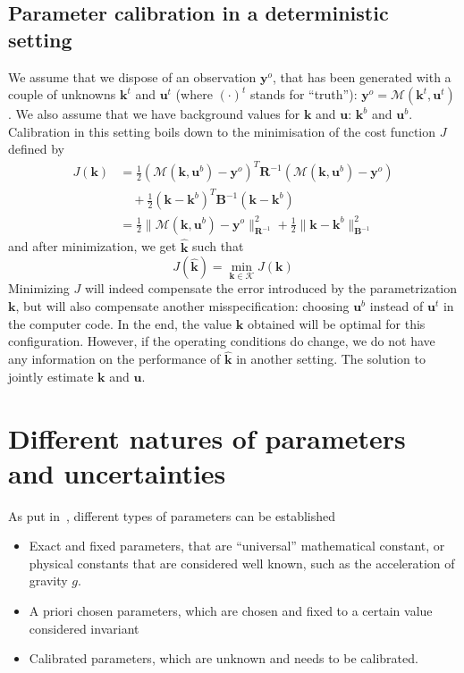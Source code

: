 \documentclass[npg]{copernicus}
\newcommand{\yobs}{\mathbf{y}^o}
\begin{document}
\subsection{Parameter calibration in a deterministic setting}
We assume that we dispose of an observation $\yobs$, that has been generated with a couple of unknowns $\mathbf{k}^t$ and $\mathbf{u}^t$ (where $(\cdot)^t$ stands for ``truth''): $\yobs=  \mathcal{M}(\mathbf{k}^t, \mathbf{u}^t)$. We also assume that we have background values for $\mathbf{k}$ and $\mathbf{u}$: $\mathbf{k}^b$ and $\mathbf{u}^b$. Calibration in this setting boils down to the minimisation of the cost function $J$ defined by
\begin{align}
  \label{eq:def_cost_fun}
  J(\mathbf{k}) &= \frac12(\mathcal{M}(\mathbf{k},\mathbf{u}^b) - \yobs)^T \mathbf{R}^{-1}  (\mathcal{M}(\mathbf{k},\mathbf{u}^b)-\yobs) \nonumber\\
                & \quad +\frac12 (\mathbf{k}-\mathbf{k}^b)^T \mathbf{B}^{-1} (\mathbf{k}-\mathbf{k}^b) \nonumber \\
                & = \frac12\|\mathcal{M}(\mathbf{k},\mathbf{u}^b) - \yobs \|_{\mathbf{R}^{-1}}^2 + \frac12\|\mathbf{k}-\mathbf{k}^b\|_{\mathbf{B}^{-1}}^2 
\end{align}
and after minimization, we get $\hat{\mathbf{k}}$ such that
\begin{equation}
  \label{eq:khat_def}
  J(\hat{\mathbf{k}}) = \min_{\mathbf{k} \in \mathcal{K}} J(\mathbf{k})
\end{equation}
Minimizing $J$ will indeed compensate the error introduced by the parametrization $\mathbf{k}$, but will also compensate another misspecification: choosing $\mathbf{u}^b$ instead of $\mathbf{u}^t$ in the computer code.
In the end, the value $\hat{\mathbf{k}}$ obtained will be optimal for this configuration. However, if the operating conditions do change, we do not have any information on the performance of $\hat{\mathbf{k}}$ in another setting. The solution to jointly estimate $\mathbf{k}$ and $\mathbf{u}$.

\section{Different natures of parameters and uncertainties}
As put in~\cite{walker_defining_2003}, different types of parameters can be established
\begin{itemize}
\item Exact and fixed parameters, that are ``universal'' mathematical constant, or physical constants that are considered well known, such as the acceleration of gravity $g$.
\item A priori chosen parameters, which are chosen and fixed to a certain value considered invariant
\item Calibrated parameters, which are unknown and needs to be calibrated.
\end{itemize}
\end{document}
